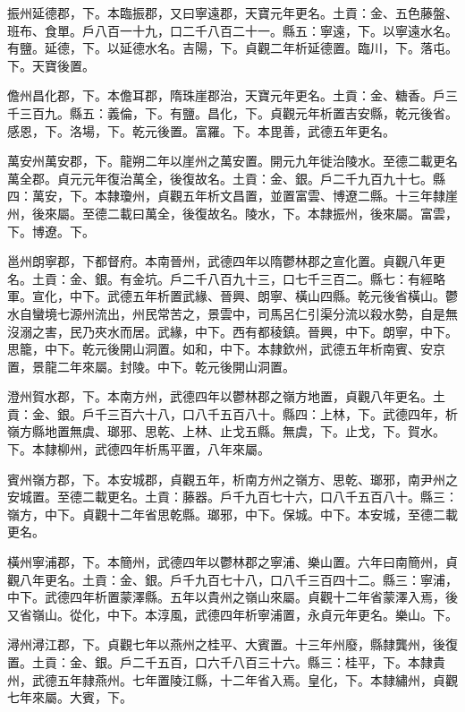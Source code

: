 \begin{pinyinscope}
 振州延德郡，下。本臨振郡，又曰寧遠郡，天寶元年更名。土貢：金、五色藤盤、班布、食單。戶八百一十九，口二千八百二十一。縣五：寧遠，下。以寧遠水名。有鹽。延德，下。以延德水名。吉陽，下。貞觀二年析延德置。臨川，下。落屯。下。天寶後置。



 儋州昌化郡，下。本儋耳郡，隋珠崖郡治，天寶元年更名。土貢：金、糖香。戶三千三百九。縣五：義倫，下。有鹽。昌化，下。貞觀元年析置吉安縣，乾元後省。感恩，下。洛場，下。乾元後置。富羅。下。本毘善，武德五年更名。



 萬安州萬安郡，下。龍朔二年以崖州之萬安置。開元九年徙治陵水。至德二載更名萬全郡。貞元元年復治萬全，後復故名。土貢：金、銀。戶二千九百九十七。縣四：萬安，下。本隸瓊州，貞觀五年析文昌置，並置富雲、博遼二縣。十三年隸崖州，後來屬。至德二載曰萬全，後復故名。陵水，下。本隸振州，後來屬。富雲，下。博遼。下。



 邕州朗寧郡，下都督府。本南晉州，武德四年以隋鬱林郡之宣化置。貞觀八年更名。土貢：金、銀。有金坑。戶二千八百九十三，口七千三百二。縣七：有經略軍。宣化，中下。武德五年析置武緣、晉興、朗寧、橫山四縣。乾元後省橫山。鬱水自蠻境七源州流出，州民常苦之，景雲中，司馬呂仁引渠分流以殺水勢，自是無沒溺之害，民乃夾水而居。武緣，中下。西有都稜鎮。晉興，中下。朗寧，中下。思籠，中下。乾元後開山洞置。如和，中下。本隸欽州，武德五年析南賓、安京置，景龍二年來屬。封陵。中下。乾元後開山洞置。



 澄州賀水郡，下。本南方州，武德四年以鬱林郡之嶺方地置，貞觀八年更名。土貢：金、銀。戶千三百六十八，口八千五百八十。縣四：上林，下。武德四年，析嶺方縣地置無虞、瑯邪、思乾、上林、止戈五縣。無虞，下。止戈，下。賀水。下。本隸柳州，武德四年析馬平置，八年來屬。



 賓州嶺方郡，下。本安城郡，貞觀五年，析南方州之嶺方、思乾、瑯邪，南尹州之安城置。至德二載更名。土貢：藤器。戶千九百七十六，口八千五百八十。縣三：嶺方，中下。貞觀十二年省思乾縣。瑯邪，中下。保城。中下。本安城，至德二載更名。



 橫州寧浦郡，下。本簡州，武德四年以鬱林郡之寧浦、樂山置。六年曰南簡州，貞觀八年更名。土貢：金、銀。戶千九百七十八，口八千三百四十二。縣三：寧浦，中下。武德四年析置蒙澤縣。五年以貴州之嶺山來屬。貞觀十二年省蒙澤入焉，後又省嶺山。從化，中下。本淳風，武德四年析寧浦置，永貞元年更名。樂山。下。



 潯州潯江郡，下。貞觀七年以燕州之桂平、大賓置。十三年州廢，縣隸龔州，後復置。土貢：金、銀。戶二千五百，口六千八百三十六。縣三：桂平，下。本隸貴州，武德五年隸燕州。七年置陵江縣，十二年省入焉。皇化，下。本隸繡州，貞觀七年來屬。大賓，下。




\end{pinyinscope}

